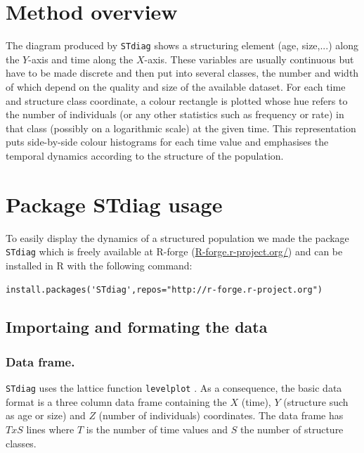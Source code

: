 \section{Method overview}

The diagram produced by \texttt{STdiag} shows a structuring element (age, size,...) along
the $Y$-axis and time along the $X$-axis. These variables are usually continuous
but have to be made discrete and then put into several classes, the number and width
of which depend on the quality and size of the available dataset. For each time
and structure class coordinate, a colour rectangle is plotted whose hue refers
to the number of individuals (or any other statistics such as frequency or rate)
in that class (possibly on a logarithmic scale) at the given time. This
representation puts side-by-side colour histograms for each time value and
emphasises the temporal dynamics according to the structure of the population.

\section{Package STdiag usage}

To easily display the dynamics of a structured population we made the package
\texttt{STdiag} which is freely available at R-forge (\url{R-forge.r-project.org/}) and
can be installed in R with the following command:

\begin{verbatim}
install.packages('STdiag',repos="http://r-forge.r-project.org")
\end{verbatim}

\subsection{Importaing and formating the data}

\subsubsection{Data frame.}
\texttt{STdiag} uses the lattice function \texttt{levelplot}
\autocites{sarkar2008a}.
As a consequence, the basic data format is a three column data frame containing the
$X$ (time), $Y$ (structure such as age or size) and $Z$ (number of individuals)
coordinates. The data frame has $TxS$ lines where $T$ is the number of time
values and $S$ the number of structure classes.

